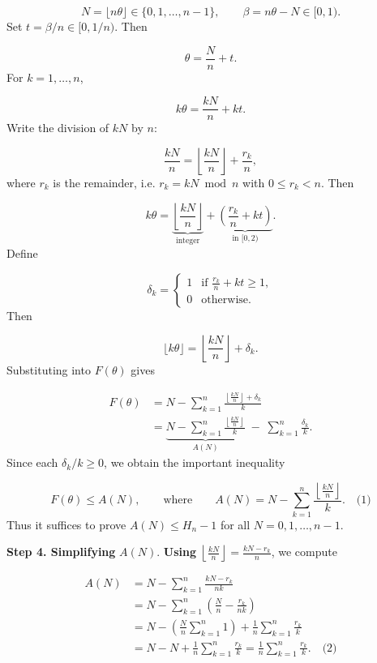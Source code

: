 \[
N = \lfloor n\theta\rfloor \in \{0,1,\dots,n-1\}, \qquad \beta = n\theta - N \in [0,1).
\]
Set \(t = \beta/n \in [0,1/n)\). Then\par
\[
\theta = \frac{N}{n} + t.
\]
For \(k=1,\dots,n\),\par
\[
k\theta = \frac{kN}{n} + kt.
\]
Write the division of \(kN\) by \(n\):\par
\[
\frac{kN}{n} = \left\lfloor\frac{kN}{n}\right\rfloor + \frac{r_k}{n},
\]
where \(r_k\) is the remainder, i.e. \(r_k = kN \bmod n\) with \(0\le r_k < n\). Then\par
\[
k\theta = \underbrace{\left\lfloor\frac{kN}{n}\right\rfloor}_{\text{integer}} + \underbrace{\left(\frac{r_k}{n} + kt\right)}_{\text{in }[0,2)}.
\]
Define\par
\[
\delta_k = \begin{cases}
1 & \text{if } \frac{r_k}{n} + kt \ge 1,\\
0 & \text{otherwise}.
\end{cases}
\]
Then\par
\[
\lfloor k\theta\rfloor = \left\lfloor\frac{kN}{n}\right\rfloor + \delta_k.
\]
Substituting into \(F(\theta)\) gives\par
\[
\begin{aligned}
F(\theta) &= N - \sum_{k=1}^{n}\frac{\left\lfloor\frac{kN}{n}\right\rfloor + \delta_k}{k} \\
&= \underbrace{N - \sum_{k=1}^{n}\frac{\left\lfloor\frac{kN}{n}\right\rfloor}{k}}_{A(N)} \;-\; \sum_{k=1}^{n}\frac{\delta_k}{k}.
\end{aligned}
\]
Since each \(\delta_k/k \ge 0\), we obtain the important inequality\par
\[
F(\theta) \le A(N),\qquad\text{where}\qquad A(N) = N - \sum_{k=1}^{n}\frac{\left\lfloor\frac{kN}{n}\right\rfloor}{k}. \quad\text{(1)}
\]
Thus it suffices to prove \(A(N) \le H_n - 1\) for all \(N = 0,1,\dots,n-1\).\par
\textbf{Step 4. Simplifying }\(A(N)\).\textbf{ Using }\(\left\lfloor\frac{kN}{n}\right\rfloor = \frac{kN - r_k}{n}\), we compute\par
\[
\begin{aligned}
A(N) &= N - \sum_{k=1}^{n}\frac{kN - r_k}{n k} \\
&= N - \sum_{k=1}^{n}\left(\frac{N}{n} - \frac{r_k}{n k}\right) \\
&= N - \left(\frac{N}{n}\sum_{k=1}^{n}1\right) + \frac1n\sum_{k=1}^{n}\frac{r_k}{k} \\
&= N - N + \frac1n\sum_{k=1}^{n}\frac{r_k}{k} = \frac1n\sum_{k=1}^{n}\frac{r_k}{k}. \quad\text{(2)}
\end{aligned}
\]
